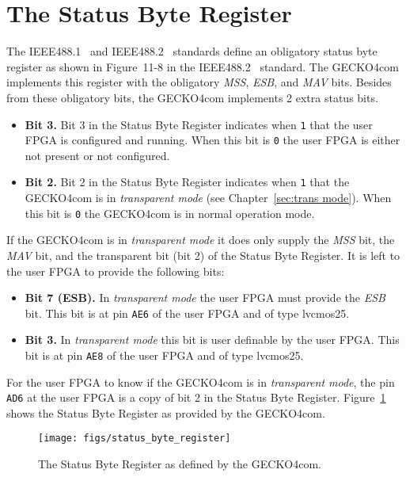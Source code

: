 \section{The Status Byte Register}
\label{sec: SBR}
The IEEE488.1~\cite{ieee488_1} and IEEE488.2~\cite{ieee488_2} standards define
an obligatory status byte register as shown in Figure~11-8 in the
IEEE488.2~\cite{ieee488_2} standard. The {\sc GECKO4com} implements this
register with the obligatory \emph{MSS}, \emph{ESB}, and \emph{MAV} bits.
Besides from these obligatory bits, the {\sc GECKO4com} implements 2 extra
status bits.
\begin{itemize}
\item \textbf{Bit 3.} Bit 3 in the Status Byte Register indicates when \verb+1+
that the user FPGA is configured and running. When this bit is \verb+0+ the user
FPGA is either not present or not configured.
\item \textbf{Bit 2.} Bit 2 in the Status Byte Register indicates when \verb+1+
that the {\sc GECKO4com} is in \emph{transparent mode} (see Chapter~\ref{sec:trans mode}).
When this bit is \verb+0+ the {\sc GECKO4com} is in normal operation mode.
\end{itemize}
If the {\sc GECKO4com} is in \emph{transparent mode} it does only supply the
\emph{MSS} bit, the \emph{MAV} bit, and the transparent bit (bit 2) of the
Status Byte Register. It is left to the user FPGA to provide the following bits:
\begin{itemize}
\item \textbf{Bit 7 (ESB).} In \emph{transparent mode} the user FPGA {\sc must}
provide the \emph{ESB} bit. This bit is at pin \verb+AE6+ of the user FPGA and
of type {\sc lvcmos25}.
\item \textbf{Bit 3.} In \emph{transparent mode} this bit is user definable by
the user FPGA. This bit is at pin \verb+AE8+ of the user FPGA and of type {\sc
lvcmos25}.
\end{itemize}
For the user FPGA to know if the {\sc GECKO4com} is in \emph{transparent mode},
the pin \verb+AD6+ at the user FPGA is a copy of bit 2 in the Status Byte
Register. Figure~\ref{fig:stb} shows the Status Byte Register as provided by the
{\sc GECKO4com}.
\begin{figure}[t]
\centering%
\texttt{[image: figs/status\_byte\_register]}
\caption{The Status Byte Register as defined by the {\sc GECKO4com}.}
\label{fig:stb}
\end{figure}
